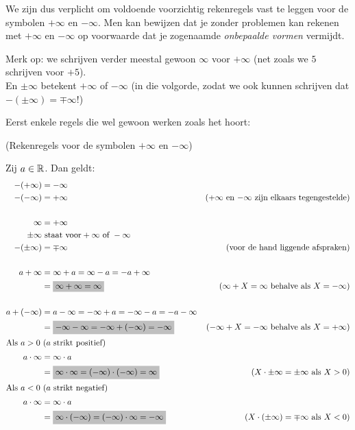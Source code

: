\documentclass[numbers]{ximera}
\begin{document}
We zijn dus verplicht om voldoende voorzichtig rekenregels vast te leggen voor de symbolen $+\infty$ en $-\infty$. Men kan bewijzen dat je zonder problemen kan rekenen met $+\infty$ en $-\infty$  op voorwaarde dat je zogenaamde \textit{onbepaalde vormen} vermijdt.

Merk op: we schrijven verder meestal gewoon $\infty$ voor $+\infty$ (net zoals we $5$ schrijven voor $+5$). \\
En $\pm\infty$ betekent $+\infty$ of $-\infty$ (in die volgorde, zodat we ook kunnen schrijven dat $-(\pm\infty) = \mp\infty$!)

Eerst enkele regels die wel gewoon werken zoals het hoort:
\begin{proposition} (Rekenregels voor de symbolen $+\infty$ en $-\infty$)
	
	Zij $a\in\mathbb{R}$. Dan geldt:	
	\begin{align*}
	-(+\infty) & = -\infty \\
	-(-\infty) & = +\infty  & \text{($+\infty$ en $-\infty$ zijn elkaars tegengestelde)}\\ 
	\\
	\infty & = +\infty   \\
	\pm\infty &\text{ staat voor} +\infty \text{ of } -\infty \\
	-(\pm\infty) &= \mp\infty &\text{(voor de hand liggende afspraken)} \\
	\\
	a+\infty & = \infty+a = \infty - a = -a +\infty \\
	& = \colorbox{lightgray}{$\infty + \infty = \infty$} & \text{($\infty + X =\infty$ behalve als $X=-\infty$)} \\
	\\
	a+(-\infty) & = a-\infty = -\infty+a =-\infty - a = -a - \infty \\
	& = \colorbox{lightgray}{$-\infty - \infty = -\infty+(-\infty) = -\infty$} & \text{($-\infty+X=-\infty$ behalve als $X=+\infty$)} \\
	\intertext{Als $a>0$ ($a$ strikt positief)}	         
	a\cdot\infty & = \infty\cdot a \\
	& = \colorbox{lightgray}{$\infty \cdot \infty = (-\infty) \cdot (-\infty) = \infty$} & \text{($X\cdot\pm\infty=\pm\infty$ als $X>0$)} \\
	\intertext{Als $a<0$ ($a$ strikt negatief)}	         
	a\cdot\infty & = \infty\cdot a \\
	& = \colorbox{lightgray}{$\infty \cdot (-\infty) = (-\infty)\cdot\infty = -\infty$} & \text{($X\cdot(\pm\infty) = \mp\infty$ als $X<0$)} \\
	\end{align*}	
\end{proposition}  
\end{document}
